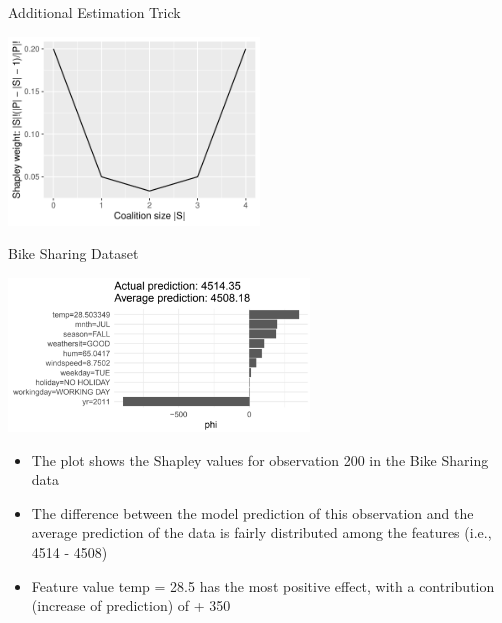 \documentclass[11pt,compress,t,notes=noshow, aspectratio=169, xcolor=table]{beamer}
\begin{document}
\begin{vbframe}{Additional Estimation Trick}
      \begin{center}
        \includegraphics[width=0.5\textwidth]{figure/shapley-weights}
      \end{center}
\end{vbframe}

\begin{vbframe}{Bike Sharing Dataset}

\begin{center}
\includegraphics[width=0.6\textwidth]{figure_man/bike-sharing03.png}
\end{center}

\begin{itemize}
    \item The plot shows the Shapley values for observation 200 in the Bike Sharing data
    \item The difference between the model prediction of this observation and the average prediction of the data is fairly distributed among the features (i.e., 4514 - 4508)
    \item Feature value temp = 28.5 has the most positive effect, with a contribution (increase of prediction) of + 350
\end{itemize}
\end{vbframe}

\end{document}
